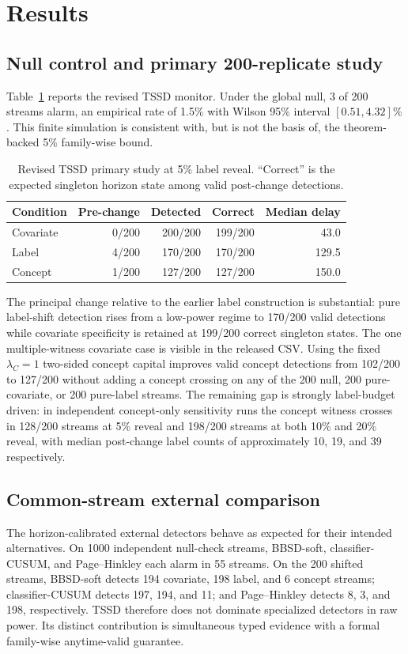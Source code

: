 \documentclass[11pt,a4paper]{article}
\theoremstyle{definition}
\newcommand{\1}{\mathbf{1}}
\begin{document}
\section{Results}
\label{sec:results}

\subsection{Null control and primary 200-replicate study}
Table~\ref{tab:primary} reports the revised TSSD monitor. Under the global null, 3 of 200 streams alarm, an empirical rate of 1.5\% with Wilson 95\% interval $[0.51,4.32]\%$. This finite simulation is consistent with, but is not the basis of, the theorem-backed 5\% family-wise bound.

\begin{table}[t]
\centering
\caption{Revised TSSD primary study at 5\% label reveal. ``Correct'' is the expected singleton horizon state among valid post-change detections.}
\label{tab:primary}
\small
\begin{tabular}{lrrrr}
\toprule
Condition & Pre-change & Detected & Correct & Median delay \\
\midrule
Covariate & 0/200 & 200/200 & 199/200 & 43.0 \\
Label & 4/200 & 170/200 & 170/200 & 129.5 \\
Concept & 1/200 & 127/200 & 127/200 & 150.0 \\
\bottomrule
\end{tabular}
\end{table}

The principal change relative to the earlier label construction is substantial: pure label-shift detection rises from a low-power regime to 170/200 valid detections while covariate specificity is retained at 199/200 correct singleton states. The one multiple-witness covariate case is visible in the released CSV. Using the fixed $\lambda_C=1$ two-sided concept capital improves valid concept detections from 102/200 to 127/200 without adding a concept crossing on any of the 200 null, 200 pure-covariate, or 200 pure-label streams. The remaining gap is strongly label-budget driven: in independent concept-only sensitivity runs the concept witness crosses in 128/200 streams at 5\% reveal and 198/200 streams at both 10\% and 20\% reveal, with median post-change label counts of approximately 10, 19, and 39 respectively.

\subsection{Common-stream external comparison}
The horizon-calibrated external detectors behave as expected for their intended alternatives. On 1000 independent null-check streams, BBSD-soft, classifier-CUSUM, and Page--Hinkley each alarm in 55 streams. On the 200 shifted streams, BBSD-soft detects 194 covariate, 198 label, and 6 concept streams; classifier-CUSUM detects 197, 194, and 11; and Page--Hinkley detects 8, 3, and 198, respectively. TSSD therefore does not dominate specialized detectors in raw power. Its distinct contribution is simultaneous typed evidence with a formal family-wise anytime-valid guarantee.
\end{document}
